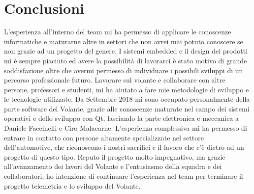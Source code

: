 \chapter{Conclusioni}


L'esperienza all'interno del team mi ha permesso di applicare le conoscenze informatiche
e maturarne altre in settori che non avrei mai potuto conoscere se non grazie ad un progetto del genere.
I sistemi embedded e il design dei prodotti mi è sempre piaciuto ed avere la possibilità di lavorarci è stato
motivo di grande soddisfazione oltre che avermi permesso di individuare i possibili sviluppi di un percorso professionale futuro.
Lavorare sul volante e collaborare con altre persone, professori e studenti, mi ha aiutato a fare 
mie metodologie di sviluppo e le tecnologie utilizzate.
Da Settembre 2018 mi sono occupato personalmente della parte software del Volante, grazie alle conoscenze maturate
nel campo dei sistemi operativi e dello sviluppo con Qt, 
lasciando la parte elettronica e meccanica a Daniele Faccinelli e Ciro Malacarne.
L'esperienza complessiva mi ha permesso di entrare in contatto con persone altamente specializzate nel settore dell'automotive, 
che riconoscono i nostri sacrifici e il lavoro che c'è dietro ad un progetto di questo tipo. 
Reputo il progetto molto impegnativo, ma grazie all'avanzamento dei lavori del Volante e l'entusiasmo 
della squadra e dei collaboratori, ho intenzione di continuare l'esperienza nel team per terminare il progetto telemetria
e lo sviluppo del Volante.